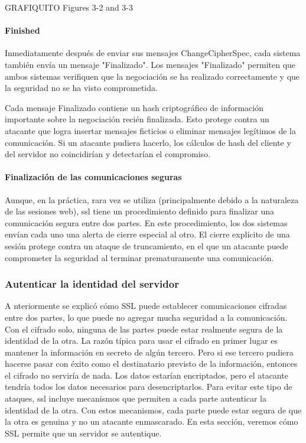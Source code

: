 GRAFIQUITO Figures 3-2 and 3-3

\paragraph*{Finished}
Inmediatamente después de enviar sus mensajes ChangeCipherSpec, cada 
sistema también envía un mensaje "Finalizado". Los mensajes "Finalizado" 
permiten que ambos sistemas verifiquen que la negociación se ha realizado 
correctamente y que la seguridad no se ha visto comprometida.

Cada mensaje Finalizado contiene un hash criptográfico de información 
importante sobre la negociación recién finalizada. Esto protege contra 
un atacante que logra insertar mensajes ficticios o eliminar mensajes 
legítimos de la comunicación. Si un atacante pudiera hacerlo, los 
cálculos de hash del cliente y del servidor no coincidirían y detectarían 
el compromiso.

\paragraph*{Finalización de las comunicaciones seguras}

Aunque, en la práctica, rara vez se utiliza (principalmente debido a la 
naturaleza de las sesiones web), ssl tiene un procedimiento definido para 
finalizar una comunicación segura entre dos partes. En este procedimiento, 
los dos sistemas envían cada uno una alerta de cierre especial al otro. 
El cierre explícito de una sesión protege contra un ataque de truncamiento,
en el que un atacante puede comprometer la seguridad al terminar 
prematuramente una comunicación.

\subsubsection*{Autenticar la identidad del servidor}
A  nteriormente se explicó cómo SSL puede establecer comunicaciones 
cifradas entre dos partes, lo que puede no agregar mucha seguridad a 
la comunicación. Con el cifrado solo, ninguna de las partes puede 
estar realmente segura de la identidad de la otra. La razón típica 
para usar el cifrado en primer lugar es mantener la información en 
secreto de algún tercero. Pero si ese tercero pudiera hacerse pasar 
con éxito como el destinatario previsto de la información, entonces el 
cifrado no serviría de nada. Los datos estarían encriptados, pero el 
atacante tendría todos los datos necesarios para desencriptarlos. Para 
evitar este tipo de ataques, ssl incluye mecanismos que permiten a cada 
parte autenticar la identidad de la otra. Con estos mecanismos, cada 
parte puede estar segura de que la otra es genuina y no un atacante 
enmascarado. En esta sección, veremos cómo SSL permite que un servidor 
se autentique.

